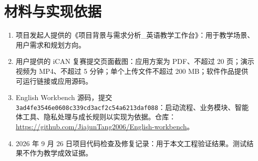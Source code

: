 \documentclass[11pt,a4paper,fontset=none]{ctexart}
\begin{document}
\section*{材料与实现依据}

\begin{enumerate}
\item 项目发起人提供的《项目背景与需求分析\_英语教学工作台》：用于教学场景、用户需求和规划方向。
\item 用户提供的 iCAN 复赛提交页面截图：应用方案为 PDF、不超过 20 页；演示视频为 MP4、不超过 5 分钟；单个上传文件不超过 200 MB；软件作品提供可运行链接或应用源码。
\item English Workbench 源码，提交 \texttt{3ad4fe3546e0608c339cd3acf2c54a6213daf088}：启动流程、业务模块、智能体工具、隐私处理与成长规则以实现为依据。仓库：\url{https://github.com/JiajunTang2006/English-workbench}。
\item 2026 年 9 月 26 日项目代码检查及修复记录：用于本文工程验证结果。测试结果不作为教学成效证据。
\end{enumerate}
\end{document}
